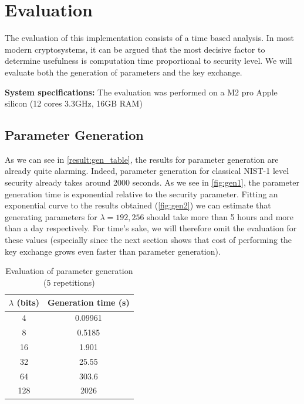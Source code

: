 \documentclass[a4paper,11pt,oneside]{report}
\begin{document}
\chapter{Evaluation}

The evaluation of this implementation consists of a time based analysis. In most modern cryptosystems, it can be argued that the most decisive factor to determine usefulness is computation time proportional to security level. We will evaluate both the generation of parameters and the key exchange. 

\textbf{System specifications:} The evaluation was performed on a M2 pro Apple silicon (12 cores 3.3GHz, 16GB RAM)


\section{Parameter Generation}

    As we can see in \autoref{result:gen_table}, the results for parameter generation are already quite alarming. Indeed, parameter generation for classical NIST-1 level security already takes around 2000 seconds. As we see in \autoref{fig:gen1}, the parameter generation time is exponential relative to the security parameter. Fitting an exponential curve to the results obtained (\autoref{fig:gen2}) we can estimate that generating parameters for $\lambda = 192,256$ should take more than 5 hours and more than a day respectively. For time's sake, we will therefore omit the evaluation for these values (especially since the next section shows that cost of performing the key exchange grows even faster than parameter generation).
    
    \begin{table}[!h]
        \label{result:gen_table}
        \begin{center}
        \begin{tabular}{| c | c |}
        \hline
        \textbf{$\lambda$ (bits)} & \textbf{Generation time (s)}  \\ 
        \hline

        4 & 0.09961 \\ \hline
        8 & 0.5185 \\ \hline
        16 & 1.901 \\ \hline
        32 & 25.55 \\ \hline
        64 & 303.6 \\ \hline
        128 & 2026 \\ \hline
        \hline
        \end{tabular}
        \end{center}
        \caption{Evaluation of parameter generation (5 repetitions)}
    \end{table}
\end{document}
